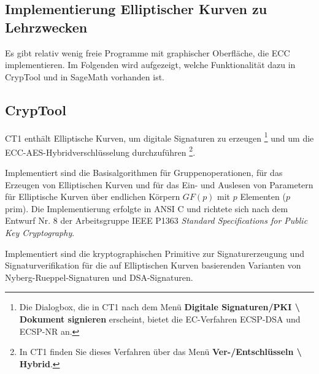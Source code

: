 \begin{refsegment}
\newpage
\section{Implementierung Elliptischer Kurven zu Lehrzwecken}
\label{ec:Implementing-for-Education}

Es gibt relativ wenig freie Programme mit graphischer Oberfläche, die ECC implementieren.
Im Folgenden wird aufgezeigt, welche Funktionalität dazu in CrypTool und in SageMath vorhanden ist.


\subsection{CrypTool}

CT1 enthält Elliptische Kurven, um digitale Signaturen zu erzeugen%
\footnote{%
Die Dialogbox, die in CT1 nach dem Menü
\textbf{Digitale Signaturen/PKI \textbackslash{} Dokument signieren} erscheint,
bietet die EC-Verfahren ECSP-DSA und ECSP-NR an.

} und um die ECC-AES-Hybridverschlüsselung durchzuführen%
\footnote{%
In CT1 finden Sie dieses Verfahren über das Menü
\textbf{Ver-/Entschlüsseln \textbackslash{} Hybrid}.

}.

Implementiert sind die Basisalgorithmen für Gruppenoperationen, für das
Erzeugen von Elliptischen Kurven und für das Ein- und Auslesen von
Parametern für Elliptische Kurven über endlichen Körpern $GF(p)$
mit $p$ Elementen ($p$ prim). Die Implementierung erfolgte in
ANSI C und richtete sich nach dem Entwurf Nr. 8 der Arbeitsgruppe
IEEE P1363 {\em Standard Specifications for Public Key Cryptography}.

Implementiert sind die kryptographischen Primitive zur Signaturerzeugung
und Signaturverifikation für die auf Elliptischen Kurven basierenden
Varianten von Nyberg-Rueppel-Signaturen und  DSA-Signaturen.


\end{refsegment}
